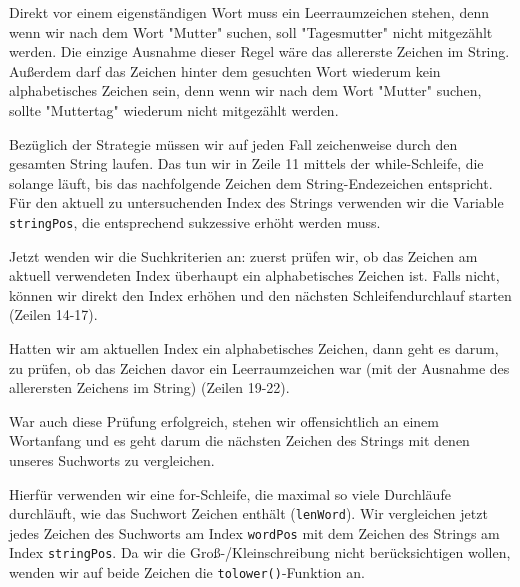 Direkt vor einem eigenständigen Wort muss ein Leerraumzeichen stehen, denn wenn
wir nach dem Wort "Mutter" suchen, soll "Tagesmutter" nicht mitgezählt werden.
Die einzige Ausnahme dieser Regel wäre das allererste Zeichen im String.
Außerdem darf das Zeichen hinter dem gesuchten Wort wiederum kein alphabetisches
Zeichen sein, denn wenn wir nach dem Wort "Mutter" suchen, sollte "Muttertag"
wiederum nicht mitgezählt werden.

Bezüglich der Strategie müssen wir auf jeden Fall zeichenweise durch den
gesamten String laufen. Das tun wir in Zeile 11 mittels der while-Schleife, die
solange läuft, bis das nachfolgende Zeichen dem String-Endezeichen entspricht.
Für den aktuell zu untersuchenden Index des Strings verwenden wir die Variable
\texttt{stringPos}, die entsprechend sukzessive erhöht werden muss.

Jetzt wenden wir die Suchkriterien an: zuerst prüfen wir, ob das Zeichen am
aktuell verwendeten Index überhaupt ein alphabetisches Zeichen ist. Falls nicht,
können wir direkt den Index erhöhen und den nächsten Schleifendurchlauf starten
(Zeilen 14-17).

Hatten wir am aktuellen Index ein alphabetisches Zeichen, dann geht es darum, zu
prüfen, ob das Zeichen davor ein Leerraumzeichen war (mit der Ausnahme des
allerersten Zeichens im String) (Zeilen 19-22).

War auch diese Prüfung erfolgreich, stehen wir offensichtlich an einem Wortanfang
und es geht darum die nächsten Zeichen des Strings mit denen unseres Suchworts
zu vergleichen.

Hierfür verwenden wir eine for-Schleife, die maximal so viele Durchläufe
durchläuft, wie das Suchwort Zeichen enthält (\texttt{lenWord}). Wir
vergleichen jetzt jedes Zeichen des Suchworts am Index \texttt{wordPos}
mit dem Zeichen des Strings am Index \texttt{stringPos}. Da wir die
Groß-/Kleinschreibung nicht berücksichtigen wollen, wenden wir auf beide Zeichen
die \texttt{tolower()}-Funktion an.

